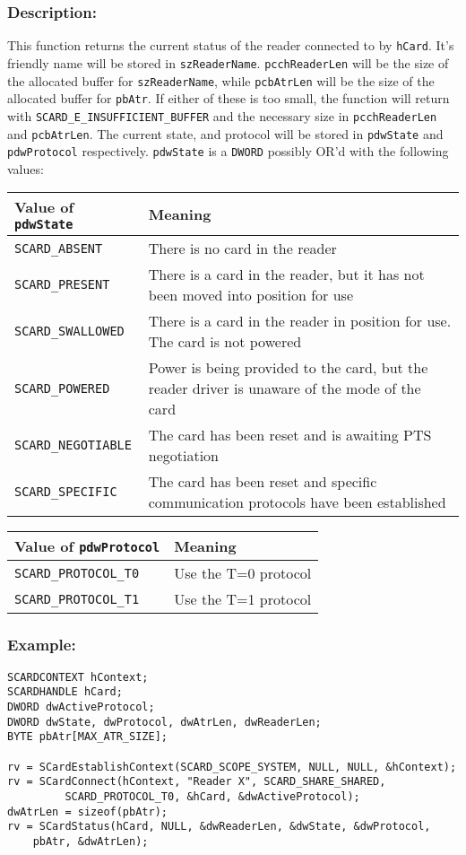 \documentclass[a4paper,12pt]{article}
\newcommand{\desc}{\subsubsection{Description:}}
\newcommand{\example}{\subsubsection{Example:}}
\begin{document}
\desc

This function returns the current status of the reader connected to by
\texttt{hCard}.  It's friendly name will be stored in
\texttt{szReaderName}.  \texttt{pcchReaderLen} will be the size of the
allocated buffer for \texttt{szReaderName}, while \texttt{pcbAtrLen}
will be the size of the allocated buffer for \texttt{pbAtr}. If either
of these is too small, the function will return with
\texttt{SCARD\_E\_INSUFFICIENT\_BUFFER} and the necessary size in
\texttt{pcchReaderLen} and \texttt{pcbAtrLen}.  The current state, and
protocol will be stored in \texttt{pdwState} and \texttt{pdwProtocol}
respectively.  \texttt{pdwState} is a \texttt{DWORD} possibly OR'd with
the following values:


\begin{tabular}{|l|p{12cm}|}
\hline
Value of \texttt{pdwState} & Meaning \\
\hline
\hline
\texttt{SCARD\_ABSENT} & There is no card in the reader\\
\texttt{SCARD\_PRESENT} & There is a card in the reader, but it has not been moved into position for use\\
\texttt{SCARD\_SWALLOWED} & There is a card in the reader in position for use. The card is not powered\\
\texttt{SCARD\_POWERED} & Power is being provided to the card, but the reader driver is unaware of the mode of the card\\
\texttt{SCARD\_NEGOTIABLE} & The card has been reset and is awaiting PTS negotiation\\
\texttt{SCARD\_SPECIFIC} & The card has been reset and specific communication protocols have been established\\
\hline
\end{tabular}

\begin{tabular}{|l|l|}
\hline
Value of \texttt{pdwProtocol} & Meaning \\
\hline
\hline
\texttt{SCARD\_PROTOCOL\_T0} & Use the T=0 protocol\\
\texttt{SCARD\_PROTOCOL\_T1} & Use the T=1 protocol\\
\hline
\end{tabular}

\example

\begin{verbatim}
SCARDCONTEXT hContext;
SCARDHANDLE hCard;
DWORD dwActiveProtocol;
DWORD dwState, dwProtocol, dwAtrLen, dwReaderLen;
BYTE pbAtr[MAX_ATR_SIZE];

rv = SCardEstablishContext(SCARD_SCOPE_SYSTEM, NULL, NULL, &hContext);
rv = SCardConnect(hContext, "Reader X", SCARD_SHARE_SHARED,
         SCARD_PROTOCOL_T0, &hCard, &dwActiveProtocol);
dwAtrLen = sizeof(pbAtr);
rv = SCardStatus(hCard, NULL, &dwReaderLen, &dwState, &dwProtocol,
    pbAtr, &dwAtrLen);
\end{verbatim}
\end{document}
